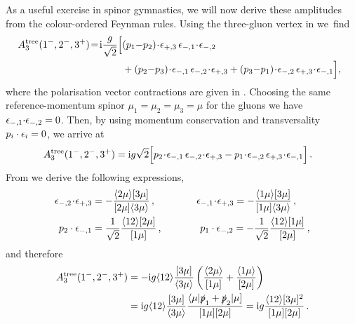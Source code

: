 As a useful exercise in spinor gymnastics, we will now 
derive these amplitudes from the colour-ordered Feynman rules.
Using the three-gluon vertex in  we~find  
\begin{align}
   \hspace{-0.2cm} A_{3}^\text{tree}(1^-,2^-,3^+) 
   \!=\!
   \i\frac{g}{\sqrt{2}}\Big[ & (p_1{-}p_2)\!\cdot\!\eps_{+,3} \,  \eps_{-,1}\!\cdot\!\eps_{-,2} 
   \nn\\ & +(p_2{-}p_3)\!\cdot\!\eps_{-,1} \, \eps_{-,2}\!\cdot\!\eps_{+,3} + (p_3{-}p_1)\!\cdot\!
   \eps_{-,2} \,  \eps_{+,3}\!\cdot\!\eps_{-,1}\Big] , 
\end{align}
where the polarisation vector contractions 
are given in . Choosing the same reference-momentum spinor $\mu_{1}=\mu_{2}=\mu_{3}=\mu$ for the gluons we have $\epsilon_{-,1} {\cdot} \epsilon_{-,2} =0$. Then, by using momentum conservation and transversality $p_i\cdot \epsilon_i=0$, 
we arrive at
\begin{align}
   \hspace{-0.3cm} A_{3}^{\text{tree}}(1^-, 2^-, 3^+) = \i g \sqrt{2} 
   \Big[ p_2\!\cdot\!\eps_{-,1} \, \eps_{-,2}\!\cdot\!\eps_{+,3} -p_1\!\cdot\!\eps_{-,2}\,  \eps_{+,3}\!\cdot\!\eps_{-,1}\Big]\, . 
\end{align}
From  we derive the following expressions,
\begin{align}
\begin{split}
   \epsilon_{-,2}\!\cdot\!\epsilon_{+,3}&= -\frac{\langle 2 \mu\rangle[3\mu ] }{[ 2 \mu] \langle 3 \mu\rangle} \, , \qquad \qquad\, 
   \epsilon_{-,1}\!\cdot\!\epsilon_{+,3}= -\frac{\langle 1 \mu\rangle[3\mu ] }{[ 1 \mu] \langle 3 \mu\rangle} \, , 
   \\
     p_2\cdot \epsilon_{-,1}&= \frac{1}{\sqrt{2}}\frac{\langle 12 \rangle[2 \mu]}{[1 \mu]}\, , \qquad \quad\ \ \,
     p_1\cdot \epsilon_{-,2}= -\frac{1}{\sqrt{2}}\frac{\langle 12 \rangle[1 \mu]}{[2 \mu]}\, ,
     \end{split}
\end{align}
and therefore
\begin{align}
\begin{split}
    A_{3}^{\text{tree}}(1^-, 2^-, 3^+) &= -\mathrm{i} g \langle 12\rangle \frac{[3\mu]}{\langle 3\mu\rangle}
   \left(  \frac{\langle 2\mu\rangle}{[1\mu]} +\frac{\langle 1\mu\rangle}{[2\mu]}  \right) \\ & = 
    \mathrm{i} g \langle 12\rangle \frac{[3\mu]}{\langle 3\mu\rangle}
   \frac{\langle \mu | \slashed{p}_1 + \slashed{p}_2 |\mu] 
  }{[1\mu][2\mu]}
  =
  \mathrm{i} g \frac{\langle 12\rangle [3\mu]^2 }{[1\mu][2\mu]}
   \, . 
   \end{split}
\end{align}
